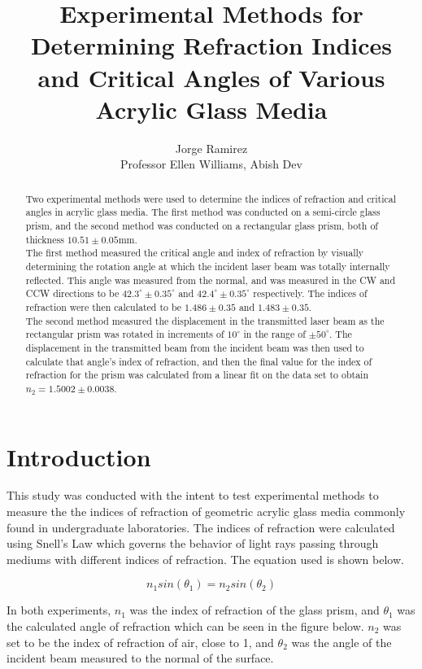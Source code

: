 \documentclass[colorlinks=true,pdfstartview=FitV,linkcolor=blue,
            citecolor=red,urlcolor=magenta]{basedoc}
\title{Experimental Methods for Determining Refraction Indices and Critical Angles of Various Acrylic Glass Media}
\author{Jorge Ramirez \\
Professor Ellen Williams, Abish Dev}
\begin{document}
  \begin{abstract}
    Two experimental methods were used to determine the indices of refraction and critical angles in acrylic glass media. The first method was conducted on a semi-circle glass prism, and the second method was conducted on a rectangular glass prism, both of thickness $10.51 \pm 0.05$mm.
    \\
    \indent The first method measured the critical angle and index of refraction by visually determining the rotation angle at which the incident laser beam was totally internally reflected. This angle was measured from the normal, and was measured in the CW and CCW directions to be $42.3^{\circ} \pm 0.35^{\circ}$ and $42.4^{\circ} \pm 0.35^{\circ}$ respectively. The indices of refraction were then calculated to be $1.486 \pm 0.35$ and $1.483 \pm 0.35$.
    \\
    \indent The second method measured the displacement in the transmitted laser beam as the rectangular prism was rotated in increments of $10^{\circ}$ in the range of $\pm50^{\circ}$. The displacement in the transmitted beam from the incident beam was then used to calculate that angle's index of refraction, and then the final value for the index of refraction for the prism was calculated from a linear fit on the data set to obtain $n_2 = 1.5002 \pm 0.0038$.

  \end{abstract}


\section{Introduction}
  This study was conducted with the intent to test experimental methods to measure the the indices of refraction of geometric acrylic glass media commonly found in undergraduate laboratories. The indices of refraction were calculated using Snell's Law which governs the behavior of light rays passing through mediums with different indices of refraction. The equation used is shown below.

    \begin{equation} \label{eq:snell}
      n_1 sin(\theta_1) = n_2 sin(\theta_2)
    \end{equation}

  In both experiments, $n_1$ was the index of refraction of the glass prism, and $\theta_1$ was the calculated angle of refraction which can be seen in the figure below. $n_2$ was set to be the index of refraction of air, close to 1, and $\theta_2$ was the angle of the incident beam measured to the normal of the surface.
\end{document}
